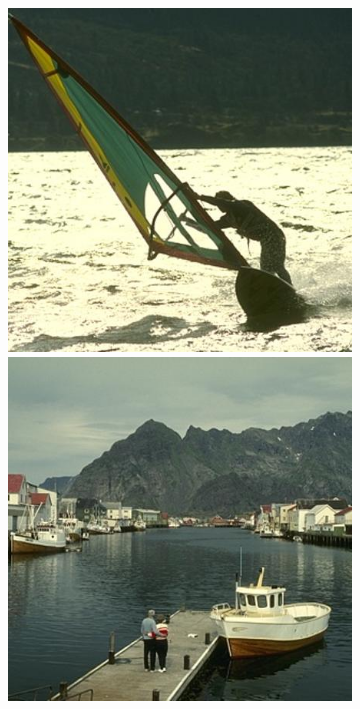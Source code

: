 \documentclass[11pt,a4paper]{article}
\begin{document}
\begin{figure}
    \centering
    \begin{subfigure}[b]{0.3\textwidth}
        \centering
        \includegraphics[width=\textwidth]{figures/dino/tile_2/62096.jpg}
        \includegraphics[width=\textwidth]{figures/dino/tile_2/219090.jpg}

\end{subfigure}
\end{figure}
\end{document}
